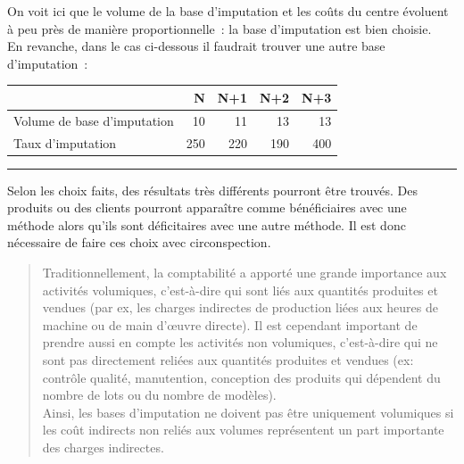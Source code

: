 \documentclass{tufte-handout}
\begin{document}
\begin{enumerate}
On voit ici que le volume de la base d'imputation et les coûts du centre évoluent à peu près de manière proportionnelle : la base d'imputation est bien choisie.\\

En revanche, dans le cas ci-dessous il faudrait trouver une autre base d'imputation :\\

\begin{center}
\begin{tabular}{lrrrr}
 & N & N+1 & N+2 & N+3\\
\hline
Volume de base d'imputation & 10 & 11 & 13 & 13\\
Taux d'imputation & 250 & 220 & 190 & 400\\
\end{tabular}
\end{center}

\noindent\rule{\textwidth}{0.5pt}
Selon les choix faits, des résultats très différents pourront être trouvés. Des produits ou des clients pourront apparaître comme bénéficiaires avec une méthode alors qu'ils sont déficitaires avec une autre méthode. Il est donc nécessaire de faire ces choix avec circonspection.\\

\begin{quote}
Traditionnellement, la comptabilité a apporté une grande importance aux activités volumiques, c'est-à-dire qui sont liés aux quantités produites et vendues (par ex, les charges indirectes de production liées aux heures de machine ou de main d’œuvre directe). Il est cependant important de prendre aussi en compte les activités non volumiques, c'est-à-dire qui ne sont pas directement reliées aux quantités produites et vendues (ex: contrôle qualité, manutention, conception des produits qui dépendent du nombre de lots ou du nombre de modèles).\\
Ainsi, les bases d’imputation ne doivent pas être uniquement volumiques si les coût indirects non reliés aux volumes représentent un part importante des charges indirectes.\\
\end{quote}


\end{enumerate}
\end{document}
